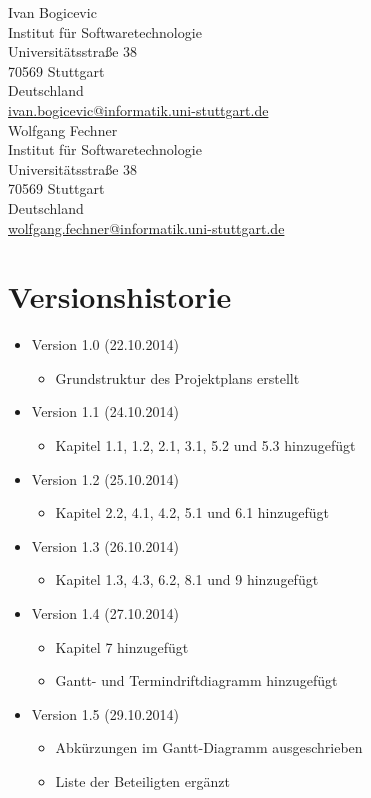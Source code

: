 \documentclass[11pt]{article}
\begin{document}
\begin{itemize}
{{		Ivan Bogicevic\\
		Institut für Softwaretechnologie\\
		Universitätsstraße 38\\
		70569 Stuttgart\\
		Deutschland\\
		\href{mailto:ivan.bogicevic@informatik.uni-stuttgart.de}{ivan.bogicevic@informatik.uni-stuttgart.de}\\
		
		Wolfgang Fechner\\
		Institut für Softwaretechnologie\\
		Universitätsstraße 38\\
		70569 Stuttgart\\
		Deutschland\\
		\href{mailto:wolfgang.fechner@informatik.uni-stuttgart.de}{wolfgang.fechner@informatik.uni-stuttgart.de}\\
	}}
\end{itemize}

\newpage

\section{Versionshistorie}

\begin{itemize}
	\item Version 1.0 (22.10.2014)
	\begin{itemize}
		\item Grundstruktur des Projektplans erstellt
	\end{itemize}
	\item Version 1.1 (24.10.2014)
	\begin{itemize}
		\item Kapitel 1.1, 1.2, 2.1, 3.1, 5.2 und 5.3 hinzugefügt
	\end{itemize}
	\item Version 1.2 (25.10.2014)
	\begin{itemize}
		\item Kapitel 2.2, 4.1, 4.2, 5.1 und 6.1 hinzugefügt
	\end{itemize}
	\item Version 1.3 (26.10.2014)
	\begin{itemize}
		\item Kapitel 1.3, 4.3, 6.2, 8.1 und 9 hinzugefügt
	\end{itemize}
	\item Version 1.4 (27.10.2014)
	\begin{itemize}
		\item Kapitel 7 hinzugefügt
		\item Gantt- und Termindriftdiagramm hinzugefügt
	\end{itemize}
	\item Version 1.5 (29.10.2014)
	\begin{itemize}
		\item Abkürzungen im Gantt-Diagramm ausgeschrieben
		\item Liste der Beteiligten ergänzt
	\end{itemize}
\end{itemize}
\end{document}
